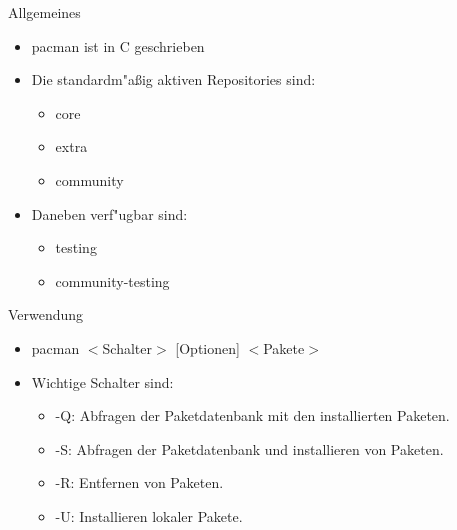 
\begin{slide}{Allgemeines}
	\begin{itemize}
		\item{pacman ist in C geschrieben}
		\item{Die standardm"{a}ßig aktiven Repositories sind:
			\begin{itemize}
				\item{core}
				\item{extra}
				\item{community}
			\end{itemize}
		}
		\item{Daneben verf"{u}gbar sind:
			\begin{itemize}
				\item{testing}
				\item{community-testing}
			\end{itemize}
		}
	\end{itemize}
\end{slide}

\begin{slide}{Verwendung}
	\begin{itemize}
		\item{pacman $<$Schalter$>$ [Optionen] $<$Pakete$>$}
		\item{Wichtige Schalter sind:
			\begin{itemize}
				\item{-Q: Abfragen der Paketdatenbank mit den installierten
					Paketen.}
				\item{-S: Abfragen der Paketdatenbank und installieren von
					Paketen.}
				\item{-R: Entfernen von Paketen.}
				\item{-U: Installieren lokaler Pakete.}
			\end{itemize}
		}
	\end{itemize}
\end{slide}

